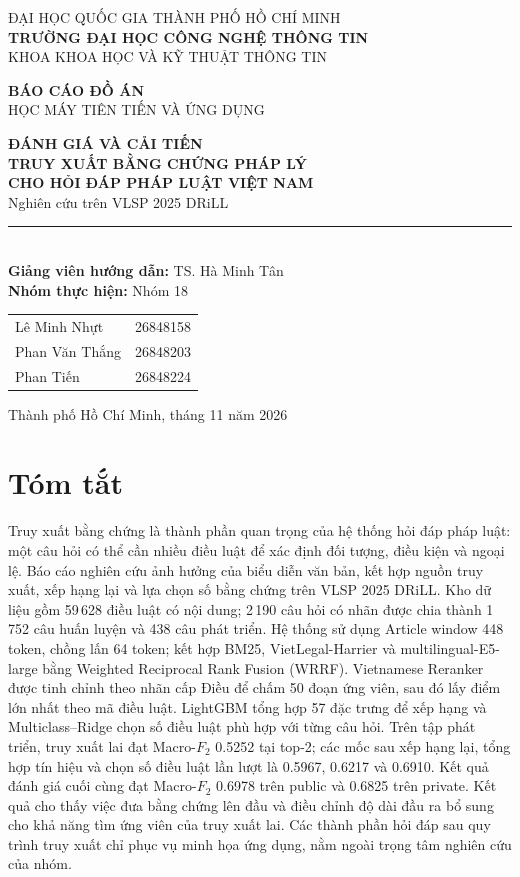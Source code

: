 \documentclass[12pt,a4paper]{article}
\begin{document}
\thispagestyle{empty}
\begin{center}
{\large ĐẠI HỌC QUỐC GIA THÀNH PHỐ HỒ CHÍ MINH}\\[5pt]
{\large\bfseries TRƯỜNG ĐẠI HỌC CÔNG NGHỆ THÔNG TIN}\\[5pt]
{\normalsize KHOA KHOA HỌC VÀ KỸ THUẬT THÔNG TIN}
\vspace{1.8cm}

{\Large\bfseries BÁO CÁO ĐỒ ÁN}\\[10pt]
{\large HỌC MÁY TIÊN TIẾN VÀ ỨNG DỤNG}
\vspace{1.4cm}

{\LARGE\bfseries\color{ink} ĐÁNH GIÁ VÀ CẢI TIẾN\\[7pt]
TRUY XUẤT BẰNG CHỨNG PHÁP LÝ\\[7pt]
CHO HỎI ĐÁP PHÁP LUẬT VIỆT NAM}\\[16pt]
{\large Nghiên cứu trên VLSP 2025 DRiLL}
\vspace{1.3cm}

\rule{0.72\textwidth}{0.6pt}\\[16pt]
{\large\textbf{Giảng viên hướng dẫn:} TS. Hà Minh Tân}\\[18pt]
{\large\textbf{Nhóm thực hiện:} Nhóm 18}\\[12pt]
\begin{tabular}{lr}
Lê Minh Nhựt & 26848158\\[6pt]
Phan Văn Thắng & 26848203\\[6pt]
Phan Tiến & 26848224
\end{tabular}
\vfill
Thành phố Hồ Chí Minh, tháng 11 năm 2026
\end{center}
\clearpage
\section*{Tóm tắt}
\noindent Truy xuất bằng chứng là thành phần quan trọng của hệ thống hỏi đáp pháp luật: một câu hỏi có thể cần nhiều điều luật để xác định đối tượng, điều kiện và ngoại lệ. Báo cáo nghiên cứu ảnh hưởng của biểu diễn văn bản, kết hợp nguồn truy xuất, xếp hạng lại và lựa chọn số bằng chứng trên VLSP 2025 DRiLL. Kho dữ liệu gồm 59\,628 điều luật có nội dung; 2\,190 câu hỏi có nhãn được chia thành 1\,752 câu huấn luyện và 438 câu phát triển. Hệ thống sử dụng Article window 448 token, chồng lấn 64 token; kết hợp BM25, VietLegal-Harrier và multilingual-E5-large bằng Weighted Reciprocal Rank Fusion (WRRF). Vietnamese Reranker được tinh chỉnh theo nhãn cấp Điều để chấm 50 đoạn ứng viên, sau đó lấy điểm lớn nhất theo mã điều luật. LightGBM tổng hợp 57 đặc trưng để xếp hạng và Multiclass--Ridge chọn số điều luật phù hợp với từng câu hỏi. Trên tập phát triển, truy xuất lai đạt Macro-$F_2$ 0.5252 tại top-2; các mốc sau xếp hạng lại, tổng hợp tín hiệu và chọn số điều luật lần lượt là 0.5967, 0.6217 và 0.6910. Kết quả đánh giá cuối cùng đạt Macro-$F_2$ 0.6978 trên public và 0.6825 trên private. Kết quả cho thấy việc đưa bằng chứng lên đầu và điều chỉnh độ dài đầu ra bổ sung cho khả năng tìm ứng viên của truy xuất lai. Các thành phần hỏi đáp sau quy trình truy xuất chỉ phục vụ minh họa ứng dụng, nằm ngoài trọng tâm nghiên cứu của nhóm.
\end{document}
